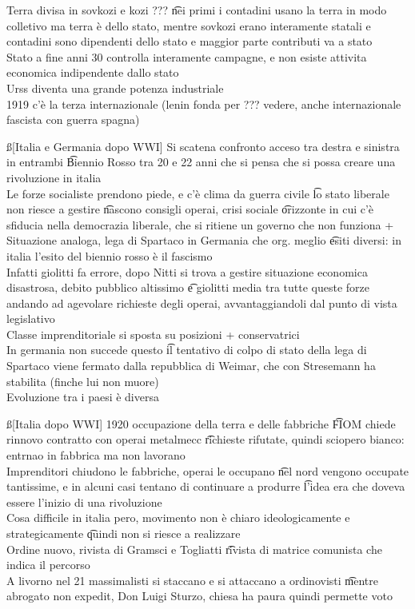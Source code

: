 \documentclass[12pt]{article}
\begin{document}
Terra divisa in sovkozi e kozi ??? \t nei primi i contadini usano la terra in modo colletivo ma terra è dello stato, mentre sovkozi erano interamente statali e contadini sono dipendenti dello stato e maggior parte contributi va a stato \\
Stato a fine anni 30 controlla interamente campagne, e non esiste attivita economica indipendente dallo stato \\
Urss diventa una grande potenza industriale \\
1919 c'è la terza internazionale (lenin fonda per ??? vedere, anche internazionale fascista con guerra spagna)

\ss[Italia e Germania dopo WWI]
Si scatena confronto acceso tra destra e sinistra in entrambi \t Biennio Rosso tra 20 e 22 anni che si pensa che si possa creare una rivoluzione in italia \\
Le forze socialiste prendono piede, e c'è clima da guerra civile \t lo stato liberale non riesce a gestire \t nascono consigli operai, crisi sociale \t orizzonte in cui c'è sfiducia nella democrazia liberale, che si ritiene un governo che non funziona + \\
Situazione analoga, lega di Spartaco in Germania che org. meglio \t esiti diversi: in italia l'esito del biennio rosso è il fascismo \\
Infatti giolitti fa errore, dopo Nitti si trova a gestire situazione economica disastrosa, debito pubblico altissimo \t e giolitti media tra tutte queste forze andando ad agevolare richieste degli operai, avvantaggiandoli dal punto di vista legislativo \\
Classe imprenditoriale si sposta su posizioni + conservatrici \\
In germania non succede questo \t il tentativo di colpo di stato della lega di Spartaco viene fermato dalla repubblica di Weimar, che con Stresemann ha stabilita (finche lui non muore) \\
Evoluzione tra i paesi è diversa

\ss[Italia dopo WWI]
1920 occupazione della terra e delle fabbriche \t FIOM chiede rinnovo contratto con operai metalmecc \t richieste rifutate, quindi sciopero bianco: entrnao in fabbrica ma non lavorano \\
Imprenditori chiudono le fabbriche, operai le occupano \t nel nord vengono occupate tantissime, e in alcuni casi tentano di continuare a produrre \t l'idea era che doveva essere l'inizio di una rivoluzione \\
Cosa difficile in italia pero, movimento non è chiaro ideologicamente e strategicamente \t quindi non si riesce a realizzare \\
Ordine nuovo, rivista di Gramsci e Togliatti \t rivista di matrice comunista che indica il percorso \\
A livorno nel 21 massimalisti si staccano e si attaccano a ordinovisti \t mentre abrogato non expedit, Don Luigi Sturzo, chiesa ha paura quindi permette voto \\
\end{document}
